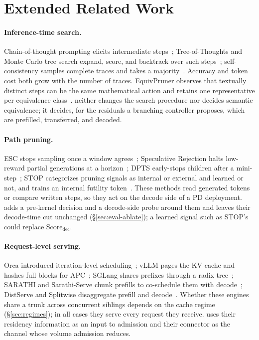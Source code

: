 \section{Extended Related Work}
\label{sec:related-full}

\paragraph{Inference-time search.}
Chain-of-thought prompting elicits intermediate steps~\cite{cot}; Tree-of-Thoughts and Monte Carlo tree search expand, score, and backtrack over such steps~\cite{tot,mctsllm}; self-consistency samples complete traces and takes a majority~\cite{selfconsistency}.
Accuracy and token cost both grow with the number of traces.
EquivPruner observes that textually distinct steps can be the same mathematical action and retains one representative per equivalence class~\cite{equivpruner}.
\sys neither changes the search procedure nor decides semantic equivalence; it decides, for the residuals a branching controller proposes, which are prefilled, transferred, and decoded.

\paragraph{Path pruning.}
ESC stops sampling once a window agrees~\cite{esc}; Speculative Rejection halts low-reward partial generations at a horizon~\cite{specrej}; DPTS early-stops children after a mini-step~\cite{dpts}; STOP categorizes pruning signals as internal or external and learned or not, and trains an internal futility token~\cite{stoploss}.
These methods read generated tokens or compare written steps, so they act on the decode side of a PD deployment.
\sys adds a pre-kernel decision and a decode-side probe around them and leaves their decode-time cut unchanged (\S\ref{sec:eval-ablate}); a learned signal such as STOP's could replace $\mathrm{Score}_{\mathrm{dec}}$.

\paragraph{Request-level serving.}
Orca introduced iteration-level scheduling~\cite{orca}; vLLM pages the KV cache and hashes full blocks for APC~\cite{vllm}; SGLang shares prefixes through a radix tree~\cite{sglang}; SARATHI and Sarathi-Serve chunk prefills to co-schedule them with decode~\cite{sarathisplit,sarathi}; DistServe and Splitwise disaggregate prefill and decode~\cite{distserve,splitwise}.
Whether these engines share a trunk across concurrent siblings depends on the cache regime (\S\ref{sec:regimes}); in all cases they serve every request they receive.
\sys uses their residency information as an input to admission and their connector as the channel whose volume admission reduces.

